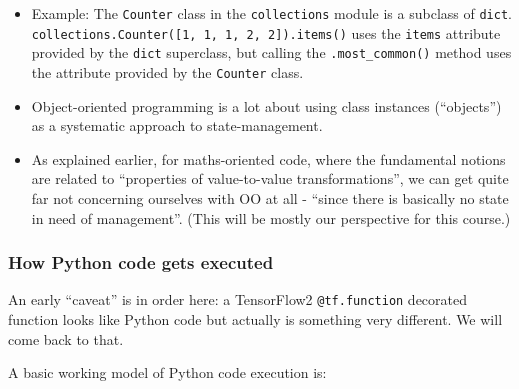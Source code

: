 \documentclass[11pt]{article}
\begin{document}
\begin{itemize}
  \begin{itemize}
  \item
    Example: The \texttt{Counter} class in the \texttt{collections}
    module is a subclass of \texttt{dict}.
    \texttt{collections.Counter({[}1,\ 1,\ 1,\ 2,\ 2{]}).items()} uses
    the \texttt{items} attribute provided by the \texttt{dict}
    superclass, but calling the \texttt{.most\_common()} method uses the
    attribute provided by the \texttt{Counter} class.
  \item
    Object-oriented programming is a lot about using class instances
    (``objects'') as a systematic approach to state-management.
  \item
    As explained earlier, for maths-oriented code, where the fundamental
    notions are related to ``properties of value-to-value
    transformations'', we can get quite far not concerning ourselves
    with OO at all - ``since there is basically no state in need of
    management''. (This will be mostly our perspective for this course.)
  \end{itemize}
\end{itemize}

\hypertarget{how-python-code-gets-executed}{%
\subsubsection{How Python code gets
executed}\label{how-python-code-gets-executed}}

An early ``caveat'' is in order here: a TensorFlow2
\texttt{@tf.function} decorated function looks like Python code but
actually is something very different. We will come back to that.

A basic working model of Python code execution is:
\end{document}

